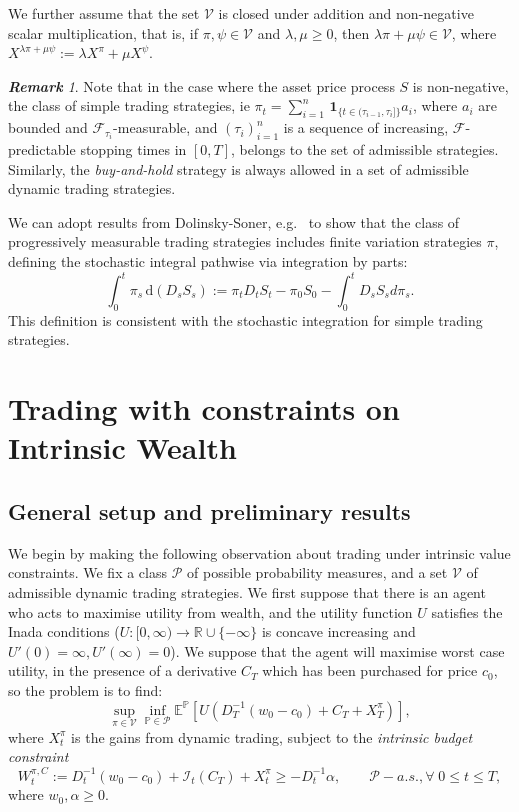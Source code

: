 \documentclass[a4paper]{amsart}
\theoremstyle{definition}
\theoremstyle{remark}
\newtheorem{remark}[theorem]{\textbf{Remark}}
\numberwithin{equation}{section}
\newcommand{\E}{\mathbb{E}}
\renewcommand{\P}{\mathbb{P}}
\newcommand{\di}{\mathrm{d}}
\newcommand{\R}{\mathbb{R}}
\newcommand{\as}{a.s.}
\newcommand{\F}{\mathcal{F}}
\newcommand{\Fc}{\mathcal{F}}
\newcommand{\indic}[1]{\boldsymbol{1}_{\{\ensuremath{#1}\}}}
\newcommand{\Edot}[2]{\E^{#1}\left[#2\right]}
\newcommand{\Pc}{\mathcal{P}}
\newcommand{\Vc}{\mathcal{V}}
\newcommand{\In}{\mathcal{I}} %
\begin{document}
We further assume that the set $\Vc$ is closed under addition and non-negative scalar multiplication, that is, if $\pi, \psi \in \Vc$ and $\lambda, \mu \ge 0$, then $\lambda \pi+\mu \psi \in \Vc$, where $X^{\lambda\pi+\mu\psi}:= \lambda X^\pi + \mu X^\psi$.

\begin{remark}\label{Rem:Est2.6}
  Note that in the case where the asset price process $S$ is non-negative, the class of simple trading strategies, ie $\pi_t = \sum_{i = 1}^n \, \indic{t \in (\tau_{i-1},\tau_i]} a_i$, where $a_i$ are bounded and  $\Fc_{\tau_i}$-measurable, and $(\tau_i)_{i=1}^n$ is a sequence of increasing, $\F$-predictable stopping times in $[0,T]$, belongs to the set of admissible strategies. Similarly, the \emph{buy-and-hold} strategy is always allowed in a set of admissible dynamic trading strategies. 
\end{remark}

We can adopt results from Dolinsky-Soner, e.g.~\cite{Dolinsky:2014aa} to show that the class of progressively measurable trading strategies includes  
finite variation strategies $\pi$, defining the stochastic integral pathwise via integration by parts: 
$$
\int_0^t \pi_s \, \di(D_sS_s) :=\pi_t D_tS_t-\pi_0 S_0-\int_0^tD_sS_s d\pi_s.
$$
This definition is consistent with the stochastic integration for simple trading strategies.

\section{Trading with constraints on Intrinsic Wealth}

\subsection{General setup and preliminary results} \label{sec:setup}

We begin by making the following observation about trading under intrinsic value constraints. We fix a class $\Pc$ of possible probability measures, and a set $\Vc$ of admissible dynamic trading strategies. We first suppose that there is an agent who acts to maximise utility from wealth, and the utility function $U$ satisfies the Inada conditions ($U:[0,\infty) \to \R\cup \{-\infty\}$ is concave increasing and $U'(0) = \infty, U'(\infty) = 0$). We suppose that the agent will maximise worst case utility, in the presence of a derivative $C_T$ which has been purchased for price $c_0$, so the problem is to find:
\begin{equation}\label{eq:MainProb2}
  \sup_{ \pi\in\Vc} \inf_{ \P \in \Pc} \Edot{\P}{U\left(D_T^{-1}(w_0 - c_0) + C_T + X_T^\pi\right)}, 
\end{equation}
where $X_t^\pi$ is the gains from dynamic trading, subject to the \emph{intrinsic budget constraint}
\begin{equation}\label{eq:Wdefn2}
  W_t^{\pi,C} := D_t^{-1}(w_0-c_0) + \In_t(C_T)  + X_t^{\pi} \ge -D_t^{-1} \alpha, \qquad \Pc-\as{}, \forall\; 0\le t \le T,
\end{equation}
where $w_0, \alpha \ge 0$.
\end{document}
